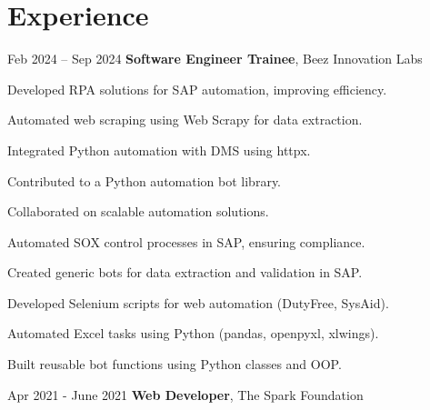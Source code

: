 \section{Experience}
\begin{twocolentry}{
        Feb 2024 – Sep 2024
    }
        \textbf{Software Engineer Trainee}, Beez Innovation Labs\end{twocolentry}
    \vspace{0.10 cm}
    \begin{onecolentry}
        \begin{highlights}
            \item Developed RPA solutions for SAP automation, improving efficiency.
            \item Automated web scraping using Web Scrapy for data extraction.
            \item Integrated Python automation with DMS using httpx.
            \item Contributed to a Python automation bot library.
            \item Collaborated on scalable automation solutions.
            \item Automated SOX control processes in SAP, ensuring compliance.
            \item Created generic bots for data extraction and validation in SAP.
            \item Developed Selenium scripts for web automation (DutyFree, SysAid).
            \item Automated Excel tasks using Python (pandas, openpyxl, xlwings).
            \item Built reusable bot functions using Python classes and OOP.

        \end{highlights}
    \end{onecolentry}
\vspace{0.2 cm}
\begin{twocolentry}{
        Apr 2021 - June 2021
    }
        \textbf{Web Developer}, The Spark Foundation\end{twocolentry}
    \vspace{0.10 cm}
